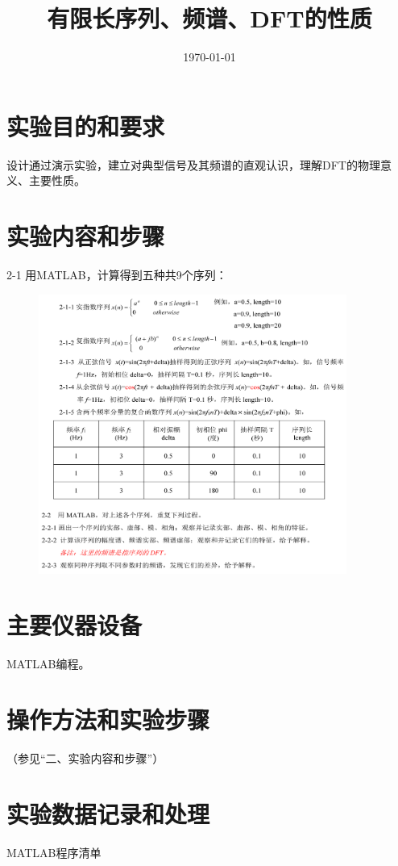 \documentclass{../source/Experiment}
\title{有限长序列、频谱、DFT的性质}
\date{\today}
\begin{document}
\makeheader
\section{实验目的和要求}
设计通过演示实验，建立对典型信号及其频谱的直观认识，理解DFT的物理意义、主要性质。

\section{实验内容和步骤}
2-1 用MATLAB，计算得到五种共9个序列：
\begin{figure}[H]
    \centering
    \includegraphics[width = 0.90\textwidth]{pic/2.png}
\end{figure}
\newpage

\section{主要仪器设备}

MATLAB编程。

\section{操作方法和实验步骤}

（参见“二、实验内容和步骤”）

\section{实验数据记录和处理}

MATLAB程序清单
\end{document}
